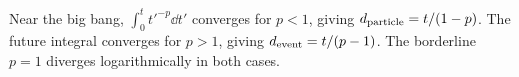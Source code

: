 \begin{enumerate}[leftmargin=2.8em,itemsep=1.2em]
Near the big bang, \(\int_0^t t'^{-p}\dd t'\) converges for \(p<1\), giving
\(d_{\rm particle}=t/(1-p)\).  The future integral converges for \(p>1\),
giving \(d_{\rm event}=t/(p-1)\).  The borderline \(p=1\) diverges
logarithmically in both cases.
\end{enumerate}
